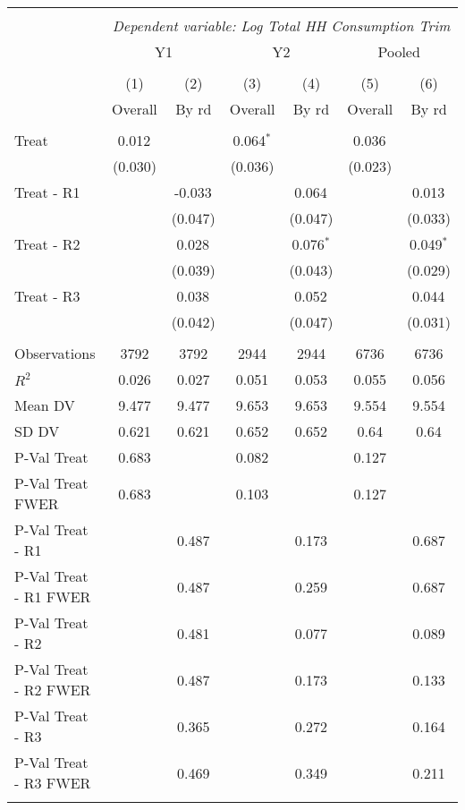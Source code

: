 
\begin{tabular}{@{\extracolsep{5pt}}lcccccc}
\\[-1.8ex]\hline
\hline \\[-1.8ex]
& \multicolumn{6}{c}{\textit{Dependent variable: Log Total HH Consumption Trim}} \
\cr \cline{2-7}
\\[-1.8ex] & \multicolumn{2}{c}{Y1} & \multicolumn{2}{c}{Y2} & \multicolumn{2}{c}{Pooled}  \\
\\[-1.8ex] & (1) & (2) & (3) & (4) & (5) & (6) 
 \\ & Overall & By rd & Overall & By rd & Overall & By rd \\
\hline \\[-1.8ex]
 Treat & 0.012$^{}$ & & 0.064$^{*}$ & & 0.036$^{}$ & \\
& (0.030) & & (0.036) & & (0.023) & \\
 Treat - R1 & & -0.033$^{}$ & & 0.064$^{}$ & & 0.013$^{}$ \\
& & (0.047) & & (0.047) & & (0.033) \\
 Treat - R2 & & 0.028$^{}$ & & 0.076$^{*}$ & & 0.049$^{*}$ \\
& & (0.039) & & (0.043) & & (0.029) \\
 Treat - R3 & & 0.038$^{}$ & & 0.052$^{}$ & & 0.044$^{}$ \\
& & (0.042) & & (0.047) & & (0.031) \\
\hline \\[-1.8ex]
 Observations & 3792 & 3792 & 2944 & 2944 & 6736 & 6736 \\
 $R^2$ & 0.026 & 0.027 & 0.051 & 0.053 & 0.055 & 0.056 \\
 Mean DV & 9.477 & 9.477 & 9.653 & 9.653 & 9.554 & 9.554 \\
 SD DV & 0.621 & 0.621 & 0.652 & 0.652 & 0.64 & 0.64 \\
 P-Val Treat & 0.683 &  & 0.082 &  & 0.127 &  \\
 P-Val Treat FWER & 0.683 &  & 0.103 &  & 0.127 &  \\
 P-Val Treat - R1 &  & 0.487 &  & 0.173 &  & 0.687 \\
 P-Val Treat - R1 FWER &  & 0.487 &  & 0.259 &  & 0.687 \\
 P-Val Treat - R2 &  & 0.481 &  & 0.077 &  & 0.089 \\
 P-Val Treat - R2 FWER &  & 0.487 &  & 0.173 &  & 0.133 \\
 P-Val Treat - R3 &  & 0.365 &  & 0.272 &  & 0.164 \\
 P-Val Treat - R3 FWER &  & 0.469 &  & 0.349 &  & 0.211 \\
\hline
\hline \\[-1.8ex]
\end{tabular}
